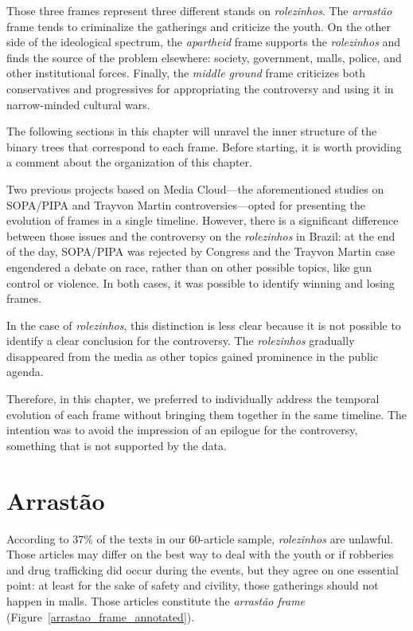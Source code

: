 Those three frames represent three different stands on \emph{rolezinhos}. The \emph{arrastão} frame tends to criminalize the gatherings and criticize the youth. On the other side of the ideological spectrum, the \emph{apartheid} frame supports the \emph{rolezinhos} and finds the source of the problem elsewhere: society, government, malls, police, and other institutional forces. Finally, the \emph{middle ground} frame criticizes both conservatives and progressives for appropriating the controversy and using it in narrow-minded cultural wars. 

The following sections in this chapter will unravel the inner structure of the binary trees that correspond to each frame. Before starting, it is worth providing a comment about the organization of this chapter.

Two previous projects based on Media Cloud---the aforementioned studies on SOPA/PIPA \autocite{benkler2013social} and Trayvon Martin \autocite{graeff2014battle} controversies---opted for presenting the evolution of frames in a single timeline. However, there is a significant difference between those issues and the controversy on the \emph{rolezinhos} in Brazil: at the end of the day, SOPA/PIPA was rejected by Congress and the Trayvon Martin case engendered a debate on race, rather than on other possible topics, like gun control or violence. In both cases, it was possible to identify winning and losing frames.

In the case of \emph{rolezinhos}, this distinction is less clear because it is not possible to identify a clear conclusion for the controversy. The \emph{rolezinhos} gradually disappeared from the media as other topics gained prominence in the public agenda.

Therefore, in this chapter, we preferred to individually address the temporal evolution of each frame without bringing them together in the same timeline. The intention was to avoid the impression of an epilogue for the controversy, something that is not supported by the data.

\section{Arrastão}

According to 37\% of the texts in our 60-article sample, \emph{rolezinhos} are unlawful. Those articles may differ on the best way to deal with the youth or if robberies and drug trafficking did occur during the events, but they agree on one essential point: at least for the sake of safety and civility, those gatherings should not happen in malls. Those articles constitute the \emph{arrastão frame} (Figure~\ref{arrastao_frame_annotated}).

